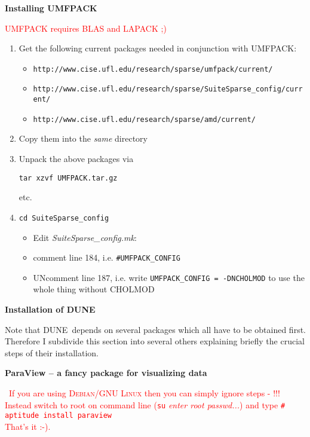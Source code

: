 \documentclass[a4paper,12pt]{article}
\newcommand{\dune}{\textsc{DUNE}\ }
\newcommand{\dyeitred}{\textcolor{red}}{}
\begin{document}
\medskip
\begin{center}
 \Large {\textbf{\textsf{Installing UMFPACK}}}
\end{center}
\dyeitred{\Stopsign UMFPACK requires BLAS and LAPACK ;)}
\begin{enumerate}
\item Get the following current packages needed in conjunction with UMFPACK:
\small{
\begin{itemize}
\item \texttt{http://www.cise.ufl.edu/research/sparse/umfpack/current/}
\item \texttt{http://www.cise.ufl.edu/research/sparse/SuiteSparse\_config/current/}
\item \texttt{http://www.cise.ufl.edu/research/sparse/amd/current/} 
\end{itemize}
}
\item Copy them into the \emph{same} directory
\item Unpack the above packages via \begin{center}\texttt{tar xzvf UMFPACK.tar.gz} \end{center} etc. 
\item \texttt{cd SuiteSparse\_config} \begin{itemize} \item Edit \textit{SuiteSparse\_config.mk}: \item comment line 184, i.e. \texttt{\#UMFPACK\_CONFIG} \item UNcomment line 187, i.e. write \texttt{UMFPACK\_CONFIG = -DNCHOLMOD} to use the whole thing without CHOLMOD \end{itemize}
\end{enumerate}


\newpage
\begin{center}
 \Large {\textbf{\textsf{Installation of DUNE}}}
\end{center}

Note that \dune depends on several packages which all have to be obtained
first.\\
Therefore I subdivide this section into several others explaining briefly the crucial
steps of their installation.

\medskip
\begin{center}
 \large {\textbf{\textsf{ParaView -- a fancy package for visualizing data}}}
\end{center}

\dyeitred{\Stopsign \ If you are using \textsc{Debian/GNU Linux} then you can simply ignore steps  - !!! \\ Instead switch to root on command line (\texttt{su} \textit{enter root passwd...}) and type \newline \hspace{1.5cm} \texttt{\# aptitude install paraview } \\ That's it :-). }
\end{document}
